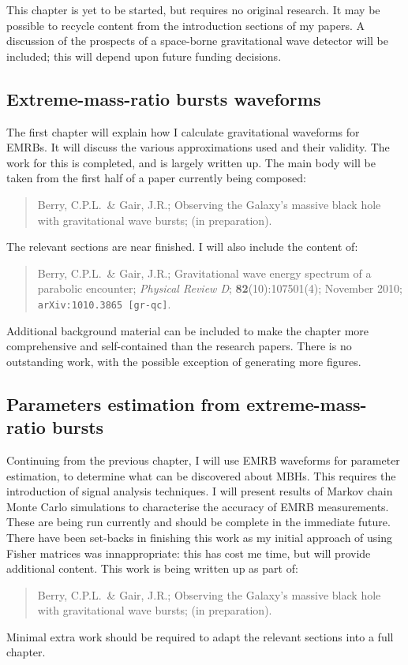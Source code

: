 \documentclass[a4paper, 11pt, twoside]{article}
\begin{document}
This chapter is yet to be started, but requires no original research. It may be possible to recycle content from the introduction sections of my papers. A discussion of the prospects of a space-borne gravitational wave detector will be included; this will depend upon future funding decisions.

\subsection{Extreme-mass-ratio bursts waveforms}

The first chapter will explain how I calculate gravitational waveforms for EMRBs. It will discuss the various approximations used and their validity. The work for this is completed, and is largely written up. The main body will be taken from the first half of a paper currently being composed:
\begin{quote}
Berry, C.P.L.\ \& Gair, J.R.; Observing the Galaxy's massive black hole with gravitational wave bursts; (in preparation).
\end{quote}
The relevant sections are near finished. I will also include the content of:
\begin{quote}
Berry, C.P.L.\ \& Gair, J.R.; Gravitational wave energy spectrum of a parabolic encounter; {\it Physical Review D}; {\bf 82}(10):107501(4); November 2010; {\tt arXiv:1010.3865 [gr-qc]}.
\end{quote}
Additional background material can be included to make the chapter more comprehensive and self-contained than the research papers. There is no outstanding work, with the possible exception of generating more figures.

\subsection{Parameters estimation from extreme-mass-ratio bursts}

Continuing from the previous chapter, I will use EMRB waveforms for parameter estimation, to determine what can be discovered about MBHs. This requires the introduction of signal analysis techniques. I will present results of Markov chain Monte Carlo simulations to characterise the accuracy of EMRB measurements. These are being run currently and should be complete in the immediate future. There have been set-backs in finishing this work as my initial approach of using Fisher matrices was innappropriate: this has cost me time, but will provide additional content. This work is being written up as part of:
\begin{quote}
Berry, C.P.L.\ \& Gair, J.R.; Observing the Galaxy's massive black hole with gravitational wave bursts; (in preparation).
\end{quote}
Minimal extra work should be required to adapt the relevant sections into a full chapter.
\end{document}
